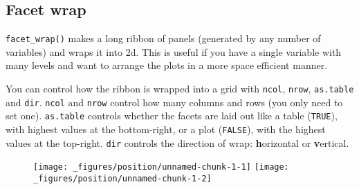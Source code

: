 \subsection{Facet wrap}\label{sub:facet-wrap}

\texttt{facet\_wrap()} makes a long ribbon of panels (generated by any
number of variables) and wraps it into 2d. This is useful if you have a
single variable with many levels and want to arrange the plots in a more
space efficient manner.  
\indexc{\textasciitilde}

You can control how the ribbon is wrapped into a grid with
\texttt{ncol}, \texttt{nrow}, \texttt{as.table} and \texttt{dir}.
\texttt{ncol} and \texttt{nrow} control how many columns and rows (you
only need to set one). \texttt{as.table} controls whether the facets are
laid out like a table (\texttt{TRUE}), with highest values at the
bottom-right, or a plot (\texttt{FALSE}), with the highest values at the
top-right. \texttt{dir} controls the direction of wrap:
\textbf{h}orizontal or \textbf{v}ertical.

\begin{Shaded}
\begin{Highlighting}[]
\StringTok{ }\StringTok{ }
\StringTok{  }\NormalTok{() +}\StringTok{ }
\StringTok{  }\NormalTok{(}\NormalTok{) +}\StringTok{ }
\StringTok{  }\NormalTok{(}\NormalTok{)}

\StringTok{ } \NormalTok{)}
\StringTok{ } \NormalTok{, } \NormalTok{)}
\end{Highlighting}
\end{Shaded}

\begin{figure}[H]
  \texttt{[image: \_figures/position/unnamed-chunk-1-1]}%
  \texttt{[image: \_figures/position/unnamed-chunk-1-2]}
\end{figure}

\begin{Shaded}
\begin{Highlighting}[]
\StringTok{ } \NormalTok{)}
\StringTok{ } \NormalTok{, } \NormalTok{)}
\end{Highlighting}
\end{Shaded}

